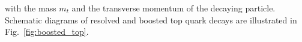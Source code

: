 with the mass $m_t$ and the transverse momentum \pt of the decaying particle. Schematic diagrams of resolved and boosted top quark decays are illustrated in Fig.~\ref{fig:boosted_top}. \\
